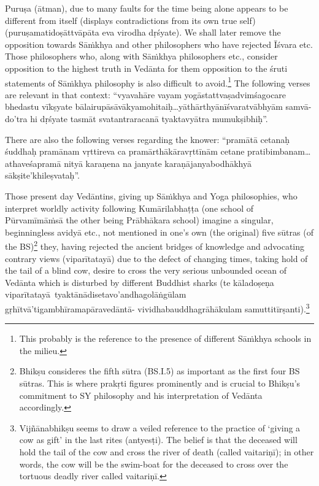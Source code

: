 Puruṣa (ātman), due to many faults for the time being alone appears to be different from itself (displays contradictions from its own true self) (puruṣamatidoṣāttvāpāta eva virodha dṛśyate). We shall later remove  the opposition towards Sāṁkhya and other philosophers who have rejected Īśvara etc. Those philosophers who, along with Sāṁkhya philosophers etc., consider opposition to the highest truth in Vedānta for them opposition to the śruti statements of Sāṁkhya philosophy is also difficult to avoid.\footnote{This probably is the reference to the presence of different Sāṁkhya schools in the milieu.} The following verses are relevant in that context: “vyavahāre vayam yogāstattvaṣadvimśagocare bhedastu vīkṣyate bālairupāsāvākyamohitaiḥ…yāthārthyānīśvaratvābhyām samvā-\break\hbox{do’\-tra} hi dṛśyate tasmāt svatantraracanā tyaktavyātra mumukṣibhiḥ”.

There are also the following verses regarding the knower: “pramātā cetanaḥ śuddhaḥ pramānam vṛttireva ca pramārthākāravṛttīnām cetane pratibimbanam…athaveśapramā nityā karaṇena na janyate karaṇājanyabodhākhyā sākṣite’khileṣvataḥ”.

Those present day Vedāntins, giving up Sāṁkhya and Yoga philosophies, who interpret worldly activity following Kumārilabhaṭṭa (one school of Pūrvamīmāṁsā the other being Prābhākara school) imagine a singular, beginningless avidyā etc., not mentioned in one’s own (the original) five sūtras (of the BS)\footnote{Bhikṣu consideres the fifth sūtra (BS.I.5) as important as the first four BS sūtras. This is where prakṛti figures prominently and is crucial to Bhikṣu’s commitment to SY philosophy and his interpretation of Vedānta accordingly.} they, having rejected the ancient bridges of knowledge and advocating contrary views (viparītatayā) due to the defect of changing times, taking hold of the tail of a blind cow, desire to cross the very serious unbounded ocean of Vedānta which is disturbed by different Buddhist sharks (te kāladoṣeṇa  viparītatayā tya\-ktānādisetavo’andhagolāṅgūlam gṛhītvā’tigambhīramapāravedāntā- vividhabauddhagrāhākulam samuttitīrṣanti).\footnote{Vijñānabhikṣu seems to draw a veiled reference to the practice of ‘giving a cow as gift’ in the last rites (antyesṭi). The belief is that the deceased will hold the tail of the cow and cross the river of death (called vaitariṇī); in other words, the cow will be the swim-boat for the deceased to cross over the tortuous deadly river called vaitariṇī.}

